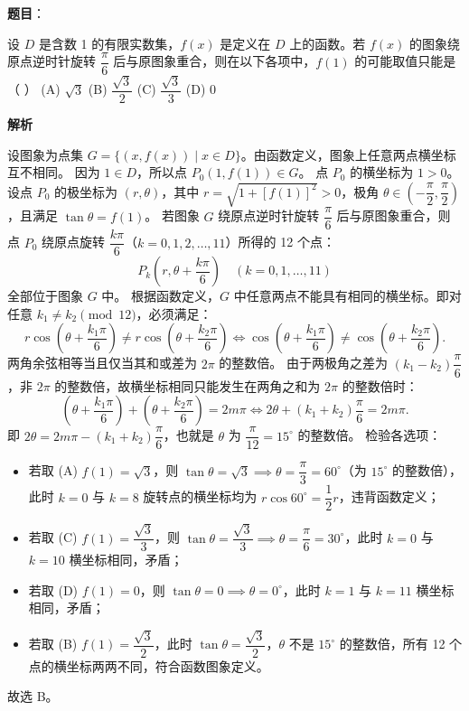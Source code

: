 \begin{answer}

\textbf{题目}：

设 $D$ 是含数 1 的有限实数集，$f(x)$ 是定义在 $D$ 上的函数。若 $f(x)$ 的图象绕原点逆时针旋转 $\dfrac{\pi}{6}$ 后与原图象重合，则在以下各项中，$f(1)$ 的可能取值只能是（ ）
(A) $\sqrt{3}$
(B) $\dfrac{\sqrt{3}}{2}$
(C) $\dfrac{\sqrt{3}}{3}$
(D) 0

\textbf{解析}

设图象为点集 $G = \{(x, f(x)) \mid x \in D\}$。由函数定义，图象上任意两点横坐标互不相同。
因为 $1 \in D$，所以点 $P_0(1, f(1)) \in G$。
点 $P_0$ 的横坐标为 $1 > 0$。设点 $P_0$ 的极坐标为 $(r, \theta)$，其中 $r = \sqrt{1 + [f(1)]^2} > 0$，极角 $\theta \in \left(-\dfrac{\pi}{2}, \dfrac{\pi}{2}\right)$，且满足 $\tan\theta = f(1)$。
若图象 $G$ 绕原点逆时针旋转 $\dfrac{\pi}{6}$ 后与原图象重合，则点 $P_0$ 绕原点旋转 $\dfrac{k\pi}{6}$（$k = 0, 1, 2, \dots, 11$）所得的 12 个点：
\nopagebreak[4]
\[P_k\left(r, \theta + \frac{k\pi}{6}\right) \quad (k = 0, 1, \dots, 11)\]
全部位于图象 $G$ 中。
根据函数定义，$G$ 中任意两点不能具有相同的横坐标。即对任意 $k_1 \ne k_2 \pmod{12}$，必须满足：
\nopagebreak[4]
\[r \cos\left(\theta + \frac{k_1\pi}{6}\right) \ne r \cos\left(\theta + \frac{k_2\pi}{6}\right) \iff \cos\left(\theta + \frac{k_1\pi}{6}\right) \ne \cos\left(\theta + \frac{k_2\pi}{6}\right).\]
两角余弦相等当且仅当其和或差为 $2\pi$ 的整数倍。
由于两极角之差为 $(k_1 - k_2)\dfrac{\pi}{6}$，非 $2\pi$ 的整数倍，故横坐标相同只能发生在两角之和为 $2\pi$ 的整数倍时：
\nopagebreak[4]
\[\left(\theta + \frac{k_1\pi}{6}\right) + \left(\theta + \frac{k_2\pi}{6}\right) = 2m\pi \iff 2\theta + (k_1 + k_2)\frac{\pi}{6} = 2m\pi.\]
即 $2\theta = 2m\pi - (k_1 + k_2)\dfrac{\pi}{6}$，也就是 $\theta$ 为 $\dfrac{\pi}{12} = 15^\circ$ 的整数倍。
检验各选项：
\begin{itemize}
\item 若取 (A) $f(1) = \sqrt{3}$，则 $\tan\theta = \sqrt{3} \implies \theta = \dfrac{\pi}{3} = 60^\circ$（为 $15^\circ$ 的整数倍），此时 $k=0$ 与 $k=8$ 旋转点的横坐标均为 $r\cos 60^\circ = \dfrac{1}{2}r$，违背函数定义；
\item 若取 (C) $f(1) = \dfrac{\sqrt{3}}{3}$，则 $\tan\theta = \dfrac{\sqrt{3}}{3} \implies \theta = \dfrac{\pi}{6} = 30^\circ$，此时 $k=0$ 与 $k=10$ 横坐标相同，矛盾；
\item 若取 (D) $f(1) = 0$，则 $\tan\theta = 0 \implies \theta = 0^\circ$，此时 $k=1$ 与 $k=11$ 横坐标相同，矛盾；
\item 若取 (B) $f(1) = \dfrac{\sqrt{3}}{2}$，此时 $\tan\theta = \dfrac{\sqrt{3}}{2}$，$\theta$ 不是 $15^\circ$ 的整数倍，所有 12 个点的横坐标两两不同，符合函数图象定义。
\end{itemize}
故选 B。


\par\medskip

\end{answer}

